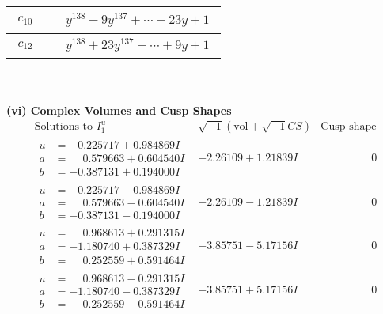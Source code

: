 \documentclass[1p]{elsarticle_modified}
\theoremstyle{definition}
\newcommand{\I}{\sqrt{-1}}
\begin{document}
\begin{tabular}{m{50pt}|m{274pt}}
\hline $$\begin{aligned}c_{10}\end{aligned}$$&$\begin{aligned}
&y^{138}-9 y^{137}+\cdots-23 y+1
\end{aligned}$\\
\hline $$\begin{aligned}c_{12}\end{aligned}$$&$\begin{aligned}
&y^{138}+23 y^{137}+\cdots+9 y+1
\end{aligned}$\\
\hline
\end{tabular}\\~\\
\newpage\flushleft \textbf{(vi) Complex Volumes and Cusp Shapes}
$$\begin{array}{c|c|c}  
\text{Solutions to }I^u_{1}& \I (\text{vol} + \sqrt{-1}CS) & \text{Cusp shape}\\
 \hline 
\begin{aligned}
u &= -0.225717 + 0.984869 I \\
a &= \phantom{-}0.579663 + 0.604540 I \\
b &= -0.387131 + 0.194000 I\end{aligned}
 & -2.26109 + 1.21839 I & \phantom{-0.000000 } 0 \\ \hline\begin{aligned}
u &= -0.225717 - 0.984869 I \\
a &= \phantom{-}0.579663 - 0.604540 I \\
b &= -0.387131 - 0.194000 I\end{aligned}
 & -2.26109 - 1.21839 I & \phantom{-0.000000 } 0 \\ \hline\begin{aligned}
u &= \phantom{-}0.968613 + 0.291315 I \\
a &= -1.180740 + 0.387329 I \\
b &= \phantom{-}0.252559 + 0.591464 I\end{aligned}
 & -3.85751 - 5.17156 I & \phantom{-0.000000 } 0 \\ \hline\begin{aligned}
u &= \phantom{-}0.968613 - 0.291315 I \\
a &= -1.180740 - 0.387329 I \\
b &= \phantom{-}0.252559 - 0.591464 I\end{aligned}
 & -3.85751 + 5.17156 I & \phantom{-0.000000 } 0 \\ \hline\begin{aligned}

\end{aligned}
\end{array}$$
\end{document}
